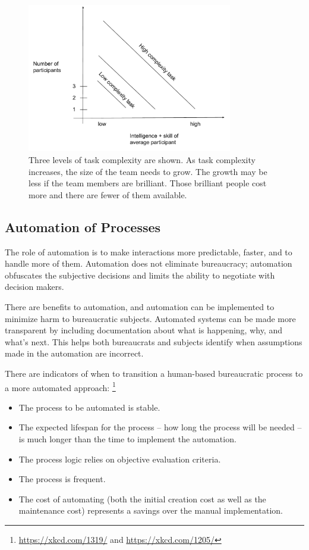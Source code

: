 \begin{figure}
\includegraphics[width=0.8\textwidth]{images/people-per-task-for-skill-level.pdf}
\caption{Three levels of task complexity are shown. As task complexity increases, the size of the team needs to grow. The growth may be less if the team members are brilliant. Those brilliant people cost more and there are fewer of them available.}
\label{fig:complexity-and-size}
\end{figure}


\subsection{Automation of Processes}

The role of automation is to make interactions more predictable, faster, and to handle more of them. Automation does not eliminate bureaucracy; automation obfuscates the subjective decisions and limits the ability to negotiate with decision makers.

There are benefits to automation, and automation can be implemented to minimize harm to bureaucratic subjects.  Automated systems can be made more transparent by including documentation about what is happening, why, and what's next.
This helps both bureaucrats and subjects identify when assumptions made in the automation are incorrect. 


There are indicators of when to transition a human-based bureaucratic process to a more automated approach:
\footnote{\href{https://xkcd.com/1319/}{https://xkcd.com/1319/} and \href{https://xkcd.com/1205/}{https://xkcd.com/1205/}}
\begin{itemize}
    \item The process to be automated is stable.
    \item The expected lifespan for the process -- how long the process will be needed -- is much longer than the time to implement the automation.
\item The process logic relies on objective evaluation criteria.  
\item The process is frequent.
\item The cost of automating (both the initial creation cost as well as the maintenance cost) represents a savings over the manual implementation.
\end{itemize}


